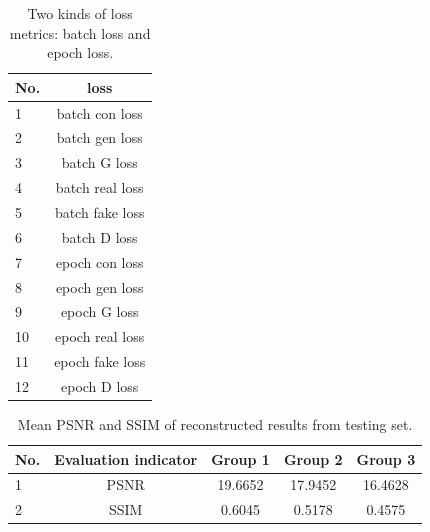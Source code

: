\documentclass[10pt,twocolumn,letterpaper]{article}
\begin{document}
\begin{table}
\begin{center}
	\begin{tabular}{lc}
		\hline	
		No. &loss	\\
		\hline
		1  &batch con loss \\
		2  &batch gen loss\\
		3  &batch G loss\\
		4  &batch real loss\\
		5  &batch fake loss\\
		6  &batch D loss \\
		7  &epoch con loss\\
		8  &epoch gen loss\\
		9  &epoch G loss \\
		10 &epoch real loss\\
		11 & epoch fake loss\\
		12 & epoch D loss \\
		\hline
	\end{tabular}
\end{center}
\caption{Two kinds of loss metrics: batch loss and epoch loss.}
\label{tab4}
\end{table}

\begin{table}
\begin{center}
	\begin{tabular}{lcccc}
		\hline	
		No. &Evaluation indicator & Group 1 & Group 2 & Group 3	\\
		\hline
		1  &PSNR  			&19.6652      	   &17.9452   		&16.4628 \\
		2  &SSIM     	   &0.6045       	  &0.5178    	   &0.4575\\
		\hline
	\end{tabular}
\end{center}
\caption{Mean PSNR and SSIM of reconstructed results from testing set.}
\label{tab5}
\end{table}
\end{document}
